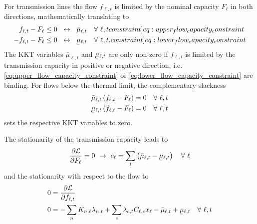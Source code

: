 \documentclass[11pt,twocolumn]{article}
\newcommand{\ubar}[1]{\underaccent{\bar}{#1}}
\newcommand{\resultsin}[1]{\hspace{6pt} \leftrightarrow  \hspace{6pt} #1}
\newcommand{\Forall}[1]{\hspace{10pt} \forall \,\, #1 }
\newcommand{\pdv}[2]{\frac{\partial #1}{\partial #2}}
\newcommand{\flow}{f_{\ell,t}}
\newcommand{\capacityflow}{F_{\ell}}
\newcommand{\capitalpriceflow}{c_{\ell}}
\newcommand{\mulowerflow}{\ubar{\mu}_{\ell,t}}
\newcommand{\muupperflow}{\bar{\mu}_{\ell,t}}
\newcommand{\lagrangian}{\mathcal{L}}
\newcommand{\lmp}[1][n]{\lambda_{#1,t}}
\newcommand{\incidence}[1][n]{K_{#1,\ell}}
\newcommand{\cycle}{C_{\ell,c}}
\newcommand{\reactance}{x_\ell}
\newcommand{\cycleprice}{\lambda_{c,t}}
\begin{document}
For transmission lines the flow $\flow$ is limited by the nominal capacity $\capacityflow$ in both directions, mathematically translating to
\begin{align}
    \flow - \capacityflow   & \le 0 \resultsin{\muupperflow} \Forall{\ell,t}
    \label[constraint]{eq:upper_flow_capacity_constraint}                      \\
    - \flow - \capacityflow & \le 0 \resultsin{\mulowerflow} \Forall{\ell,t} .
    \label[constraint]{eq:lower_flow_capacity_constraint}
\end{align}
The \ac{KKT} variables $\muupperflow$ and $\mulowerflow$ are only non-zero if $\flow$ is limited by the transmission capacity in positive or negative direction, i.e. \cref{eq:upper_flow_capacity_constraint} or \cref{eq:lower_flow_capacity_constraint} are binding. For flows below the thermal limit, the complementary slackness
\begin{align}
    \muupperflow \left( \flow - \capacityflow \right) & = 0 \Forall{\ell,t}
    \label{eq:complementary_slackness_upper_flow}                            \\
    \mulowerflow \left( \flow - \capacityflow \right) & =  0 \Forall{\ell,t}
    \label{eq:complementary_slackness_lower_flow}
\end{align}
sets the respective \ac{KKT} variables to zero.

The stationarity of the transmission capacity leads to
\begin{align}
    \pdv{\lagrangian}{\capacityflow} = 0 \,\, \rightarrow \,\,
    \capitalpriceflow =  \sum_t \left( \muupperflow - \mulowerflow \right) \Forall{\ell}
    \label{eq:capacity_flow_duality}
\end{align}
and the stationarity with respect to the flow to
\begin{align}
    0 & = \pdv{\lagrangian}{\flow}                                                                                                                 \\
    0 & = - \sum_n \incidence \lmp  + \sum_c \cycleprice \cycle \reactance  - \muupperflow + \mulowerflow \Forall{\ell, t} \label{eq:flow_duality}
\end{align}
\end{document}
